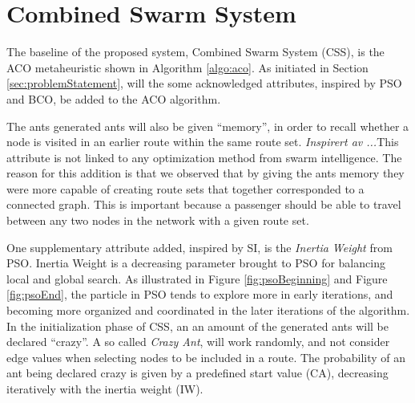 \section{Combined Swarm System}
\label{section:methodDescription}

The baseline of the proposed system, Combined Swarm System (CSS), is the ACO metaheuristic shown in Algorithm \vref{algo:aco}. As initiated in Section \vref{sec:problemStatement}, will the some acknowledged attributes, inspired by PSO and BCO, be added to the ACO algorithm.

The ants generated ants will also be given ``memory'', in order to recall whether a node is visited in an earlier route within the same route set. \emph{\color{blue}Inspirert av ...}This attribute is not linked to any optimization method from swarm intelligence. The reason for this addition is that we observed that by giving the ants memory they were more capable of creating route sets that together corresponded to a connected graph. This is important because a passenger should be able to travel between any two nodes in the network with a given route set. 

One supplementary attribute added, inspired by SI, is the \textit{Inertia Weight} from PSO. Inertia Weight is a decreasing parameter brought to PSO for balancing local and global search. As illustrated in Figure \vref{fig:psoBeginning} and Figure \vref{fig:psoEnd}, the particle in PSO tends to explore more in early iterations, and becoming more organized and coordinated in the later iterations of the algorithm. In the initialization phase of CSS, an an amount of the generated ants will be declared ``crazy''. A so called \textit{Crazy Ant}, will work randomly, and not consider edge values when selecting nodes to be included in a route. The probability of an ant being declared crazy is given by a predefined start value (CA), decreasing iteratively with the inertia weight (IW). %

